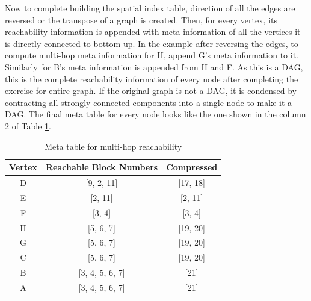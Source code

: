 

Now to complete building the spatial index table, direction of all the edges are reversed or the transpose of a graph is created. Then, for every vertex, its reachability information is appended with meta information of all the vertices it is directly connected to bottom up. In the example after reversing the edges, to compute multi-hop meta information for H, append G's meta information to it. Similarly for B's meta information is appended from H and F. As this is a DAG, this is the complete reachability information of every node after completing the exercise for entire graph. If the original graph is not a DAG, it is condensed by contracting all strongly connected components into a single node to make it a DAG. The final meta table for every node looks like the one shown in the column 2 of Table \ref{tab:multi-hop-meta}.

\begin{table}[h]
	\caption{Meta table for multi-hop reachability}
	\label{tab:multi-hop-meta}
	\begin{center}
		\renewcommand{\arraystretch}{1.25}
		\begin{tabular}{ c | c | c }
			\hline
			Vertex & Reachable Block Numbers & Compressed\\ \hline
			\hline
			D & [9, 2, 11] & [17, 18] \\
			E & [2, 11] & [2, 11] \\
			F & [3, 4] & [3, 4] \\
			H & [5, 6, 7] & [19, 20] \\
			G & [5, 6, 7] & [19, 20] \\
			C & [5, 6, 7] & [19, 20] \\
			B & [3, 4, 5, 6, 7] & [21] \\
			A & [3, 4, 5, 6, 7] & [21] \\
			\hline
		\end{tabular}
	\end{center}
\end{table}

